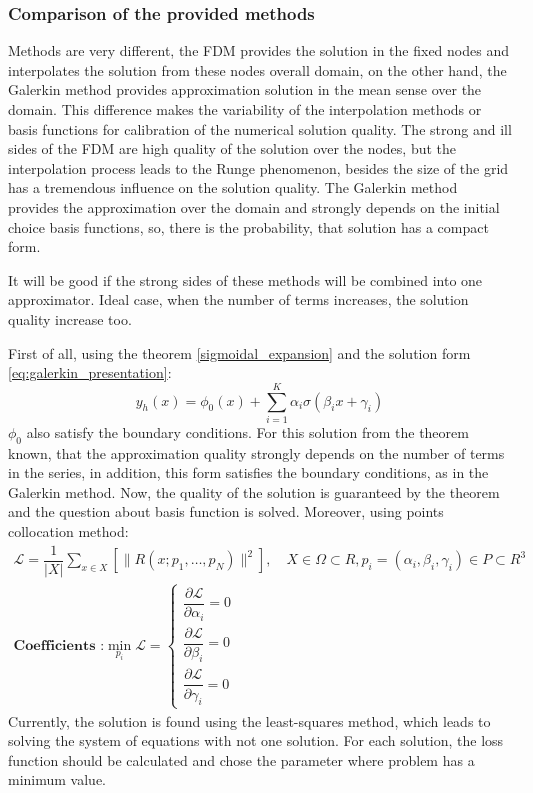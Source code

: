 \subsubsection{Comparison of the provided methods}	
Methods are very different, the FDM provides the solution in the fixed nodes and interpolates the solution from these nodes overall domain, on the other hand, the Galerkin method provides approximation solution in the mean sense over the domain. This difference makes the variability of the interpolation methods or basis functions for calibration of the numerical solution quality. The strong and ill sides of the FDM are high quality of the solution over the nodes, but the interpolation process leads to the Runge phenomenon, besides the size of the grid has a tremendous influence on the solution quality. 
The Galerkin method provides the approximation over the domain and strongly depends on the initial choice basis functions, so, there is the probability, that solution has a compact form.

It will be good if the strong sides of these methods will be combined into one approximator. Ideal case, when the number of terms increases, the solution quality increase too.

First of all, using the theorem \ref{sigmoidal_expansion} and the solution form \eqref{eq:galerkin_presentation}:
\begin{equation}
	\label{eq:perceptron_ode}
	y_h(x) = \phi_0(x) + \sum_{i = 1}^K \alpha_i \sigma(\beta_i x + \gamma_i)
\end{equation}
$\phi_0$ also satisfy the boundary conditions. 
For this solution from the theorem known, that the approximation quality strongly depends on the number of terms in the series, in addition, this form satisfies the boundary conditions, as in the Galerkin method. Now, the quality of the solution is guaranteed by the theorem and the question about basis function is solved. Moreover, using points collocation method:
\begin{equation}
	\label{eq:loss_galrekin}
	\begin{multlined}
		\mathcal{L} = \dfrac{1}{| X |} \sum_{x \in X} \left [ \| R(x; p_1, 
		\dots, p_N) \|^2 \right ], \quad X \in \Omega \subset R, p_i = (\alpha_i, \beta_i, \gamma_i) \in P \subset R^3 \\
		\textbf{Coefficients :} \min_{p_i} \mathcal{L} = \begin{cases}
			\dfrac{\partial \mathcal{L}}{\partial \alpha_i} = 0 \\[10pt]
			\dfrac{\partial \mathcal{L}}{\partial \beta_i} = 0 \\[10pt]
			\dfrac{\partial \mathcal{L}}{\partial \gamma_i} = 0
		\end{cases}
	\end{multlined}
\end{equation}
Currently, the solution is found using the least-squares method, which leads to solving the system of equations with not one solution. For each solution, the loss function should be calculated and chose the parameter where problem has a minimum value.

